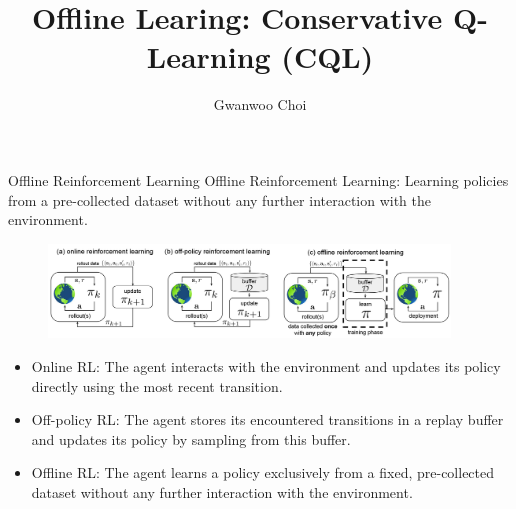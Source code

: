 \documentclass[11pt]{beamer}
\title{Offline Learing: Conservative Q-Learning (CQL)}
\author{Gwanwoo Choi}
\begin{document}

\begin{frame}
    \titlepage
\end{frame}


\begin{frame}{Offline Reinforcement Learning}
    Offline Reinforcement Learning: Learning policies from a pre-collected dataset without any further interaction with the environment.

    \begin{figure}
        \centering
        \includegraphics[width=0.95\textwidth]{OfflineRL.png}
    \end{figure}

    \begin{itemize}
        \item Online RL: The agent interacts with the environment and updates its policy directly using the most recent transition.
        \item Off-policy RL: The agent stores its encountered transitions in a replay buffer and updates its policy by sampling from this buffer.
        \item Offline RL: The agent learns a policy exclusively from a fixed, pre-collected dataset without any further interaction with the environment.
    \end{itemize}
\end{frame}
\end{document}

